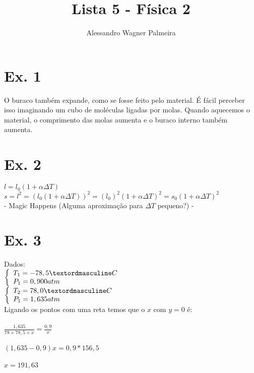 
\providecommand{\e}[1]{\ensuremath{\times 10^{#1}}}
\title{Lista 5 - Física 2}
\author{Alessandro Wagner Palmeira}

\maketitle

\section{Ex. 1}
O buraco também expande, como se fosse feito pelo material. É fácil perceber
isso imaginando um cubo de moléculas ligadas por molas. Quando aquecemos o material,
o comprimento das molas aumenta e o buraco interno também aumenta.

\section{Ex. 2}


$l = l_{0}(1+\alpha\Delta T)$ \\
$s = l^{2} = (l_{0}(1+\alpha\Delta T))^2 = (l_{0})^2(1+\alpha\Delta T)^2 = s_{0}(1+\alpha\Delta T)^2$ \\

- Magic Happens (Alguma aproximação para $\Delta T$ pequeno?) -

\section{Ex. 3}

Dados: \\
$ \left\{
	  \begin{array}{l l}
		  T_{1} = -78,5ºC \\
		  P_{1}=0,900atm \\
	  \end{array}
  \right.
$ \\
$ \left\{
  	\begin{array}{l l}
	  	T_{2} = 78,0ºC \\
      P_{1}=1,635atm 
	  \end{array}
  \right.
$ \\

Ligando os pontos com uma reta temos que o $x$ com $y=0$ é: \\ \\
$\frac{1,635}{78+78,5+x} = \frac{0,9}{x}$ \\ \\
$(1,635-0,9)x = 0,9 * 156,5$\\ \\
$x = 191,63$\\ \\

